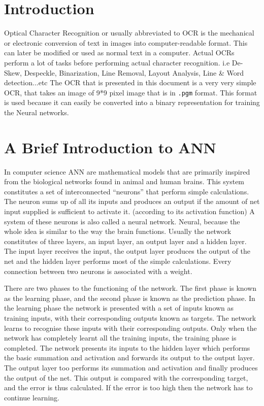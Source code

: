 \documentclass[a4paper,12pt]{report}
\begin{document}
\pagebreak

\section*{Introduction}
Optical Character Recognition or usually abbreviated to OCR is the mechanical or electronic conversion of text in images into computer-readable
format. This can later be modified or used as normal text in a computer. Actual OCRs perform a lot of tasks before performing actual character
recognition. i.e De-Skew, Despeckle, Binarization, Line Removal, Layout Analysis, Line \& Word detection...etc \cite{wikiocr}
The OCR that is presented in this document is a very very simple OCR, that takes an image of 9*9 pixel image that is in \verb+.pgm+ format.
This format is used because it can easily be converted into a binary representation for training the Neural networks.

\section*{A Brief Introduction to ANN}
In computer science ANN are mathematical models that are primarily inspired from the biological networks found in animal and human brains. 
This system constitutes a set of interconnected ``neurons'' that perform simple calculations.
The neuron sums up of all its inputs and produces an output if the amount of net input supplied is sufficient to activate it. (according to its activation function)
A system of these neurons is also called a neural network. Neural, because the whole idea is similar to the way the brain functions.
Usually the network constitutes of three layers, an input layer, an output layer and a hidden layer. The input layer receives the input,
the output layer produces the output of the net and the hidden layer performs most of the simple calculations.
Every connection between two neurons is associated with a weight. 

There are two phases to the functioning of the network. The first phase is known as the learning phase, and the second phase is known as the prediction phase.
In the learning phase the network is presented with a set of inputs known as training inputs, with their corresponding outputs known as targets.
The network learns to recognise these inputs with their corresponding outputs. Only when the network has completely learnt all the training inputs, the training phase 
is completed. The network presents its inputs to the hidden layer which performs the basic summation and activation and forwards its output to the output layer.
The output layer too performs its summation and activation and finally produces the output of the net. This output is compared with the corresponding target, and
the error is thus calculated. If the error is too high then the network has to continue learning. 
\end{document}
